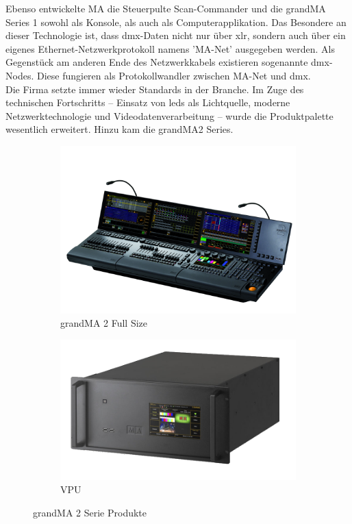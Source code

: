 \documentclass[11pt]{scrartcl}
\begin{document}
\noindent
Ebenso entwickelte MA die Steuerpulte Scan-Commander und die grandMA Series 1 sowohl als
Konsole, als auch als Computerapplikation. Das Besondere an dieser Technologie ist, dass \ac{dmx}-Daten
nicht nur über \ac{xlr}, sondern auch über ein eigenes Ethernet-Netzwerkprotokoll namens 'MA-Net'
ausgegeben werden. Als Gegenstück am anderen Ende des Netzwerkkabels existieren sogenannte
\ac{dmx}-Nodes. Diese fungieren als Protokollwandler zwischen MA-Net und \ac{dmx}.\\
Die Firma setzte immer wieder Standards in der Branche. Im Zuge des technischen Fortschritts –
Einsatz von \ac{led}s als Lichtquelle, moderne Netzwerktechnologie und Videodatenverarbeitung –
wurde die Produktpalette wesentlich erweitert. Hinzu kam die grandMA2 Series.\\
\begin{figure}[H]
    \centering
    \begin{subfigure}[b]{0.45\textwidth}
        \includegraphics[width=\textwidth]{images/MA_grandMA2_full-size.png}
        \caption{grandMA 2 Full Size}
    \end{subfigure}
    \hfill 
    \begin{subfigure}[b]{0.4\textwidth}
        \includegraphics[width=\textwidth]{images/MA-VPU-plus_d.png}
        \caption{VPU}
    \end{subfigure}
    \caption{grandMA 2 Serie Produkte}\label{fig:gma2}
\end{figure}
\end{document}
